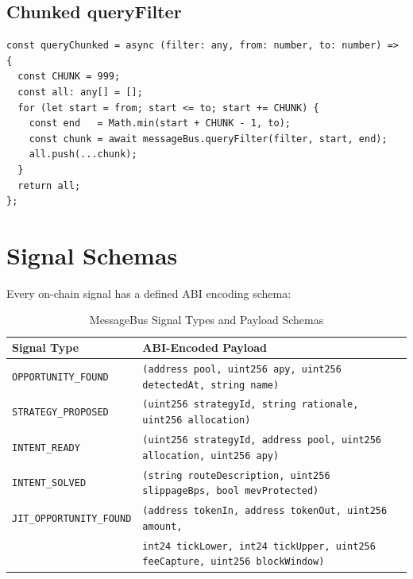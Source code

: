 \documentclass[11pt,a4paper]{article}
\begin{document}
\subsection{Chunked queryFilter}

\begin{lstlisting}[caption=Chunked queryFilter Respecting Somnia's 1000-Block Limit]
const queryChunked = async (filter: any, from: number, to: number) => {
  const CHUNK = 999;
  const all: any[] = [];
  for (let start = from; start <= to; start += CHUNK) {
    const end   = Math.min(start + CHUNK - 1, to);
    const chunk = await messageBus.queryFilter(filter, start, end);
    all.push(...chunk);
  }
  return all;
};
\end{lstlisting}

\section{Signal Schemas}

Every on-chain signal has a defined ABI encoding schema:

\begin{table}[H]
\centering
\caption{MessageBus Signal Types and Payload Schemas}
\begin{tabular}{@{}ll@{}}
  \toprule
  \textbf{Signal Type} & \textbf{ABI-Encoded Payload} \\
  \midrule
  \texttt{OPPORTUNITY\_FOUND} &
    \texttt{(address pool, uint256 apy, uint256 detectedAt, string name)} \\[4pt]
  \texttt{STRATEGY\_PROPOSED} &
    \texttt{(uint256 strategyId, string rationale, uint256 allocation)} \\[4pt]
  \texttt{INTENT\_READY} &
    \texttt{(uint256 strategyId, address pool, uint256 allocation, uint256 apy)} \\[4pt]
  \texttt{INTENT\_SOLVED} &
    \texttt{(string routeDescription, uint256 slippageBps, bool mevProtected)} \\[4pt]
  \texttt{JIT\_OPPORTUNITY\_FOUND} &
    \texttt{(address tokenIn, address tokenOut, uint256 amount,} \\
  & \texttt{\phantom{(}int24 tickLower, int24 tickUpper, uint256 feeCapture, uint256 blockWindow)} \\
  \bottomrule
\end{tabular}
\end{table}
\end{document}
